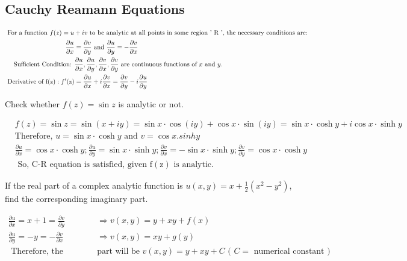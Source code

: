 	\subsection{Cauchy Reamann Equations}
	\begin{align*}
	\intertext{	For a function $f(z)=u+i v$ to be analytic at all points in some region ' $\mathrm{R}$ ', the necessary conditions are:}
		\frac{\partial u}{\partial x}&=\frac{\partial v}{\partial y} \text { and } \frac{\partial u}{\partial y}=-\frac{\partial v}{\partial x}\\
		\text{Sufficient Condition: }&\frac{\partial u}{\partial x}, \frac{\partial u}{\partial y}, \frac{\partial v}{\partial x}, \frac{\partial v}{\partial y}\text{ are continuous functions of $x$ and $y$.}\\
		\text{	Derivative of }\mathrm{f}(\mathrm{z}): f^{\prime}(\mathrm{z})&=\frac{\partial u}{\partial x}+i \frac{\partial v}{\partial x}=\frac{\partial v}{\partial y}-i \frac{\partial u}{\partial y}
	\end{align*}
	\begin{exercise}
		Check whether $f(z)=\sin z$ is analytic or not.
	\end{exercise}
	\begin{answer}
		\begin{align*}
		&f(z)=\sin z=\sin (x+i y)=\sin x \cdot \cos (i y)+\cos x \cdot \sin (i y)=\sin x \cdot \cosh y+i \cos x \cdot \sinh y\\
		&\text{Therefore, }u=\sin x \cdot \cosh y\text{ and }v=\cos x.sinhy \\
		&\frac{\partial u}{\partial x}=\cos x \cdot \cosh y ; \frac{\partial u}{\partial y}=\sin x \cdot \sinh y ; \frac{\partial v}{\partial x}=-\sin x \cdot \sinh y ; \frac{\partial v}{\partial y}=\cos x \cdot \cosh y\\
		&\text { So, C-R equation is satisfied, given } \mathrm{f}(\mathrm{z}) \text { is analytic. }
		\end{align*}
	\end{answer}
	\begin{exercise}
		If the real part of a complex analytic function is $u(x, y)=x+\frac{1}{2}\left(x^{2}-y^{2}\right)$, find the corresponding imaginary part.
	\end{exercise}
	\begin{answer}
		\begin{align*}
		\frac{\partial u}{\partial x}=x+1=\frac{\partial v}{\partial y} & \Rightarrow v(x, y)=y+x y+f(x) \\
		\frac{\partial u}{\partial y}=-y=-\frac{\partial v}{\partial x} & \Rightarrow v(x, y)=x y+g(y)\\
	\text{	Therefore, the imaginary }&\text{part will be }v(x, y)=y+x y+C
	\text{	( $C=$ numerical constant )}
		\end{align*}
	\end{answer}
